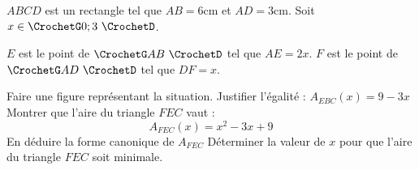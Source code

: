 \vfill

\begin{Activite}
$ABCD$ est un rectangle tel que $AB=6$cm et $AD=3$cm. Soit $x\in \CrochetG 0;3\,\,\CrochetD$. \\[0.4em]

\begin{MultiColonnes}{2}
\tcbitem $E$ est le point de $\CrochetG AB\,\,\CrochetD$ tel que $AE=2x$.
\tcbitem $F$ est le point de $\CrochetG AD\,\,\CrochetD$ tel que $DF=x$.
\end{MultiColonnes}

\begin{tcbenumerate}[2]
    \tcbitem Faire une figure représentant la situation.
    \tcbitem Justifier l'égalité : $A_{EBC}(x)=9-3x$
    \tcbitem Montrer que l'aire du triangle $FEC$ vaut : $$A_{FEC}(x)=x^2-3x+9$$
    \tcbitem En déduire la forme canonique de $A_{FEC}$
    \tcbitem[raster multicolumn=2] Déterminer la valeur de $x$ pour que l'aire du triangle $FEC$ soit minimale.
\end{tcbenumerate}
\end{Activite}
\vfill
\phantom{a}